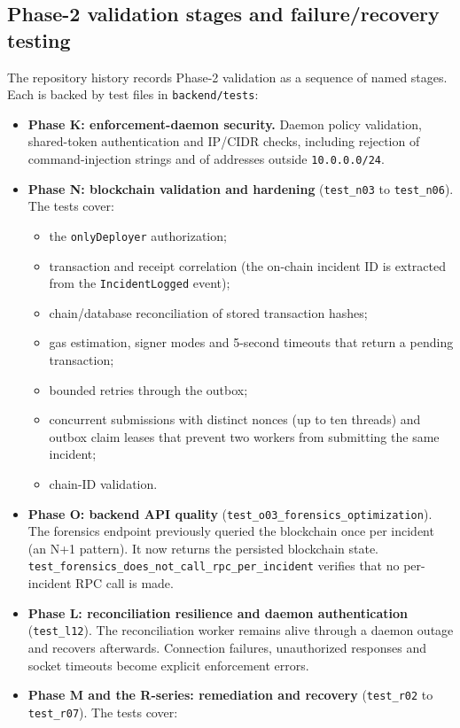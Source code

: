 \documentclass[12pt,a4paper]{report}
\begin{document}
\subsection{Phase-2 validation stages and failure/recovery testing}
The repository history records Phase-2 validation as a sequence of named stages. Each is backed by test files in \texttt{backend/tests}:
\begin{itemize}
    \item \textbf{Phase K: enforcement-daemon security.} Daemon policy validation, shared-token authentication and IP/CIDR checks, including rejection of command-injection strings and of addresses outside \texttt{10.0.0.0/24}.
    \item \textbf{Phase N: blockchain validation and hardening} (\texttt{test\_n03} to \texttt{test\_n06}). The tests cover:
    \begin{itemize}
        \item the \texttt{onlyDeployer} authorization;
        \item transaction and receipt correlation (the on-chain incident ID is extracted from the \texttt{IncidentLogged} event);
        \item chain/database reconciliation of stored transaction hashes;
        \item gas estimation, signer modes and 5-second timeouts that return a pending transaction;
        \item bounded retries through the outbox;
        \item concurrent submissions with distinct nonces (up to ten threads) and outbox claim leases that prevent two workers from submitting the same incident;
        \item chain-ID validation.
    \end{itemize}
    \item \textbf{Phase O: backend API quality} (\texttt{test\_o03\_forensics\_optimization}). The forensics endpoint previously queried the blockchain once per incident (an N+1 pattern). It now returns the persisted blockchain state. \texttt{test\_forensics\_does\_not\_call\_rpc\_per\_incident} verifies that no per-incident RPC call is made.
    \item \textbf{Phase L: reconciliation resilience and daemon authentication} (\texttt{test\_l12}). The reconciliation worker remains alive through a daemon outage and recovers afterwards. Connection failures, unauthorized responses and socket timeouts become explicit enforcement errors.
    \item \textbf{Phase M and the R-series: remediation and recovery} (\texttt{test\_r02} to \texttt{test\_r07}). The tests cover:

\end{itemize}
\end{document}
